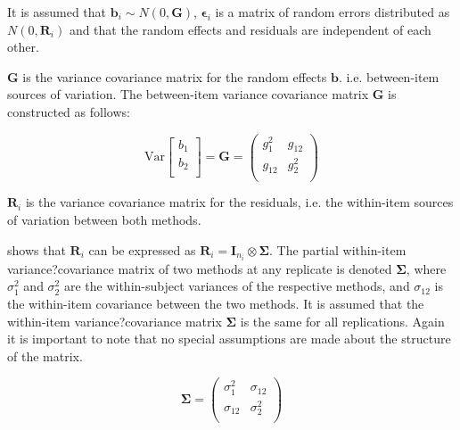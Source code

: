 \documentclass[12pt, a4paper]{report}
\theoremstyle{plain}
\theoremstyle{definition}
\theoremstyle{remark}
\begin{document}
		It is assumed that $\boldsymbol{b}_i \sim N(0,\boldsymbol{G})$, $\boldsymbol{\epsilon}_i$ is a matrix of random errors distributed as $N(0,\boldsymbol{R}_i)$ and that the random effects and residuals are independent of each other.
		
		
		$\boldsymbol{G}$ is the variance covariance matrix for the random effects $\boldsymbol{b}$.
		i.e. between-item sources of variation. The between-item variance covariance matrix $\boldsymbol{G}$ is constructed as follows:
		
		\[ \mbox{Var}  \left[
		\begin{array}{c}
		b_1   \\
		b_2  \\
		\end{array}
		\right] =  \boldsymbol{G} =\left(
		\begin{array}{cc}
		g^2_1  & g_{12} \\
		g_{12} & g^2_2 \\
		\end{array}
		\right) \]
		
		$\boldsymbol{R}_{i}$ is the variance covariance matrix for the residuals, i.e. the within-item sources of variation between both methods.
		
		\citet{hamlett} shows that $\boldsymbol{R}_{i}$  can be expressed as $\boldsymbol{R}_{i} = \boldsymbol{I}_{n_{i}} \otimes \boldsymbol{\Sigma}$. The partial within-item variance?covariance matrix of two methods at any replicate is denoted $\boldsymbol{\Sigma}$, where $\sigma^2_{1}$ and $\sigma^2_{2}$ are the within-subject variances of the respective methods, and $\sigma_{12}$ is the within-item covariance between the two methods. It is assumed that the within-item variance?covariance matrix $\boldsymbol{\Sigma}$ is the same for all replications. Again it is important to note that no special assumptions are made about the structure of the matrix.
		
		\begin{equation}
		\boldsymbol{\Sigma} = \left( \begin{array}{cc}
		\sigma^2_{1} & \sigma_{12} \\
		\sigma_{12} & \sigma^2_{2} \\
		\end{array}\right)
		\end{equation}
		
\end{document}
